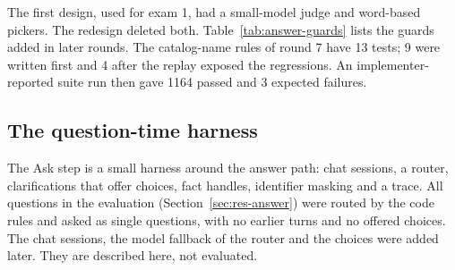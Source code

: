 \documentclass[11pt,a4paper]{article}
\begin{document}
The first design, used for exam 1, had a small-model judge and word-based pickers. The redesign deleted both. Table~\ref{tab:answer-guards} lists the guards added in later rounds. %
The catalog-name rules of round 7 have 13 tests; 9 were written first and 4 after the replay exposed the regressions. An implementer-reported suite run then gave 1164 passed and 3 expected failures. %



\subsection{The question-time harness}\label{sec:harness}
The Ask step is a small harness around the answer path: chat sessions, a router, clarifications that offer choices, fact handles, identifier masking and a trace. All questions in the evaluation (Section~\ref{sec:res-answer}) were routed by the code rules and asked as single questions, with no earlier turns and no offered choices. The chat sessions, the model fallback of the router and the choices were added later. They are described here, not evaluated. %
\end{document}
